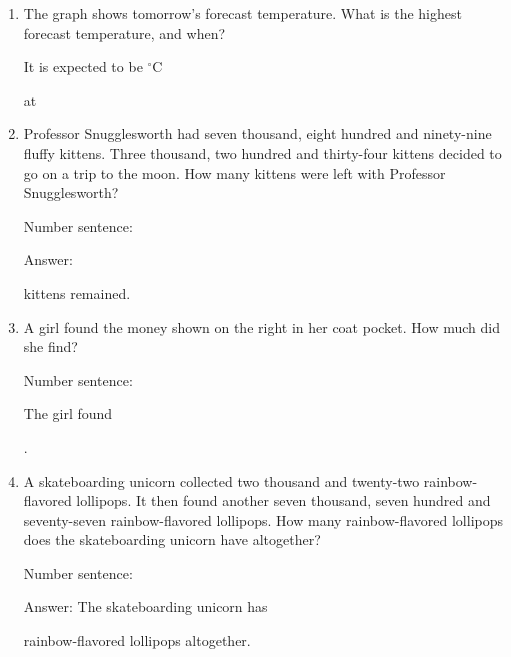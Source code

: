 \documentclass{tufte-book}
\begin{document}
\begin{enumerate}
\item {}
The graph shows tomorrow's forecast temperature. What is the highest forecast temperature, and when?\medskip

It is expected to be \dotfill$^{\circ}$C\medskip\par
at \dotfill\medskip

\item Professor Snugglesworth had seven thousand, eight hundred and ninety-nine fluffy kittens. Three thousand, two hundred and thirty-four kittens decided to go on a trip to the moon. How many kittens were left with Professor Snugglesworth?

\medskip Number sentence:  \dotfill\medskip

Answer: 
\dotfill\medskip\par\mbox{}\dotfill\medskip
kittens remained.

\item {}
A girl found the money shown on the right in her coat pocket. How much did she find?\medskip

Number sentence: \dotfill\medskip

The girl found \dotfill\medskip\par\mbox{}\dotfill.


\item A skateboarding unicorn collected two thousand and twenty-two rainbow-flavored lollipops. It then found another seven thousand, seven hundred and seventy-seven rainbow-flavored lollipops. How many rainbow-flavored lollipops does the skateboarding unicorn have altogether?

\medskip Number sentence:  \dotfill\medskip

Answer: The skateboarding unicorn has
\dotfill\medskip\par\mbox{}\dotfill\medskip\par\mbox{}\dotfill\bigskip
rainbow-flavored lollipops altogether.

\end{enumerate}
\end{document}
